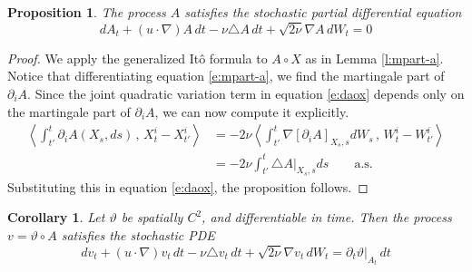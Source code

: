 \documentclass[final]{amsart}%
\newcommand{\del}{\partial}
\newcommand{\lap}{\triangle}
\newcommand{\inv}{^{-1}}
\newcommand{\grad}{\nabla}
\newcommand{\at}[1]{\big|_{#1}}
\newif\iftextstyle
\newcommand{\qv}[2]{\iftextstyle\langle#1,#2\rangle\else\left\langle#1\,,\,#2\right\rangle\fi}
\numberwithin{equation}{section}
\newtheorem{prop}[theorem]{Proposition}
\newtheorem{cor}[theorem]{Corollary}
\theoremstyle{definition}
\theoremstyle{remark}
\begin{document}
\begin{prop}\label{p:spde-a}%
The process $A$ satisfies the stochastic partial differential equation
\begin{equation}
\label{e:spde-a} dA_t + (u \cdot \grad) A \, dt - \nu \lap A \,dt + \sqrt{2\nu} \grad A \, dW_t = 0
\end{equation}
\end{prop}
\begin{proof}%
We apply the generalized It\^o formula to $A\circ X$ as in Lemma \ref{l:mpart-a}. Notice that differentiating equation \eqref{e:mpart-a}, we find the martingale part of $\del_i A$. Since the joint quadratic variation term in equation \eqref{e:daox} depends only on the martingale part of $\del_i A$, we can now compute it explicitly.%
\begin{align*}
\qv{\int_{t'}^t \del_i A(X_s, ds)}{X^i_t - X^i_{t'}}%
    &= -2\nu \qv{\int_{t'}^t \grad \left[\del_i A\right]_{X_s, s} dW_s }{W^i_t - W^i_{t'}}\\
    &= -2\nu \int_{t'}^t \lap A\at{X_s, s} ds	\qquad\text{a.s.}
\end{align*}
Substituting this in equation \eqref{e:daox}, the proposition follows.
\end{proof}

\begin{cor}\label{c:spde-v}%
Let $\vartheta$ be spatially $C^2$, and differentiable in time. Then the process $v = \vartheta \circ A$ satisfies the stochastic PDE
\begin{equation}
\label{e:spde-v} dv_t + (u \cdot \grad) v_t\, dt -\nu \lap v_t \,dt + \sqrt{2\nu} \grad v_t \,dW_t = \del_t \vartheta\at{A_t} \,dt
\end{equation}
\end{cor}
\end{document}
